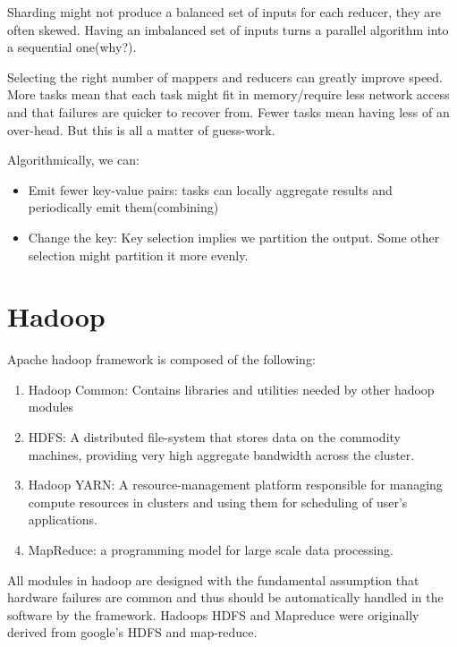 \documentclass[11pt]{article}
\begin{document}
Sharding might not produce a balanced set of inputs for each reducer, they are often skewed. Having an imbalanced set of inputs turns a parallel algorithm into a sequential one(why?)\cite{ques}.

Selecting the right number of mappers and reducers can greatly improve speed. More tasks mean that each task might fit in memory/require less network access and that failures are quicker to recover from. Fewer tasks mean having less of an over-head. But this is all a matter of guess-work.

Algorithmically, we can:
\begin{itemize}
\item Emit fewer key-value pairs: tasks can locally aggregate results and periodically emit them(combining)
\item Change the key: Key selection implies we partition the output. Some other selection might partition it more evenly.
\end{itemize}

\section{Hadoop}

Apache hadoop framework is composed of the following:
\begin{enumerate}
\item Hadoop Common: Contains libraries and utilities needed by other hadoop modules
\item HDFS: A distributed file-system that stores data on the commodity machines, providing very high aggregate bandwidth across the cluster. 
\item Hadoop YARN: A resource-management platform responsible for managing compute resources in clusters and using them for scheduling of user's applications.
\item MapReduce: a programming model for large scale data processing.
\end{enumerate}

All modules in hadoop are designed with the fundamental assumption that hardware failures are common and thus should be automatically handled in the software by the framework. Hadoops HDFS and Mapreduce were originally derived from google's HDFS and map-reduce. 
\end{document}
